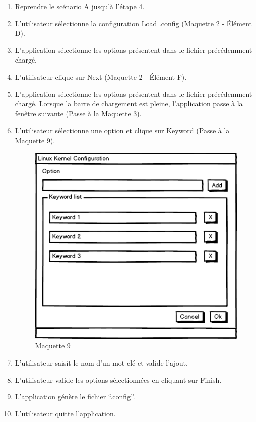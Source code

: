 \documentclass[16pts]{report}
\begin{document}
\begin{enumerate}
    \item Reprendre le scénario A jusqu’à l’étape 4.
    \item L’utilisateur sélectionne la configuration Load .config (Maquette 2 -
        Élément D).
    \item L’application sélectionne les options présentent dans le fichier
        précédemment chargé.
    \item L’utilisateur clique sur Next (Maquette 2 - Élément F).
    \item L’application sélectionne les options présentent dans le fichier
        précédemment chargé. Lorsque la barre de chargement est pleine,
        l’application passe à la fenêtre suivante (Passe à la Maquette 3).
    \item L’utilisateur sélectionne une option et clique sur Keyword (Passe à
        la Maquette 9).
    \begin{figure}[H]
        \includegraphics[scale=0.5]{illustrations/maquettes/Maquette_9_keyword_dialog.png}
        \centering
        \caption{Maquette 9}
        \label{fig:Maq9}
    \end{figure}
    \item L’utilisateur saisit le nom d’un mot-clé et valide l’ajout.
    \item L’utilisateur valide les options sélectionnées en cliquant sur Finish.
    \item L’application génère le fichier “.config”.
    \item L’utilisateur quitte l’application.
\end{enumerate}
\end{document}
